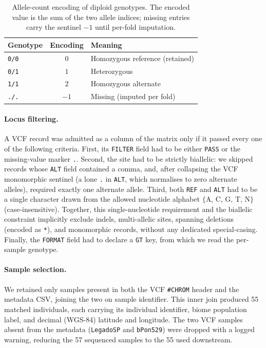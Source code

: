 \documentclass[twocolumn,10pt]{article}
\begin{document}
\begin{table}[t]
\centering
\begin{tabular}{lcl}
\toprule
Genotype & Encoding & Meaning \\
\midrule
\texttt{0/0} & $0$ & Homozygous reference (retained) \\
\texttt{0/1} & $1$ & Heterozygous \\
\texttt{1/1} & $2$ & Homozygous alternate \\
\texttt{./.} & $-1$ & Missing (imputed per fold) \\
\bottomrule
\end{tabular}
\caption{Allele-count encoding of diploid genotypes. The encoded value is the sum of the two allele
indices; missing entries carry the sentinel $-1$ until per-fold imputation.}
\label{tab:genotype-encoding}
\end{table}

\paragraph{Locus filtering.} A VCF record was admitted as a column of the matrix only if it passed
every one of the following criteria. First, its \texttt{FILTER} field had to be either \texttt{PASS}
or the missing-value marker \texttt{.}. Second, the site had to be strictly biallelic: we skipped
records whose \texttt{ALT} field contained a comma, and, after collapsing the VCF monomorphic
sentinel (a lone \texttt{.} in \texttt{ALT}, which normalises to zero alternate alleles), required
exactly one alternate allele. Third, both \texttt{REF} and \texttt{ALT} had to be a single character
drawn from the allowed nucleotide alphabet $\{$A, C, G, T, N$\}$ (case-insensitive). Together, this
single-nucleotide requirement and the biallelic constraint implicitly exclude indels, multi-allelic
sites, spanning deletions (encoded as \texttt{*}), and monomorphic records, without any dedicated
special-casing. Finally, the \texttt{FORMAT} field had to declare a \texttt{GT} key, from which we
read the per-sample genotype.

\paragraph{Sample selection.} We retained only samples present in both the VCF \texttt{\#CHROM}
header and the metadata CSV, joining the two on sample identifier. This inner join produced 55
matched individuals, each carrying its individual identifier, biome population label, and decimal
(WGS-84) latitude and longitude. The two VCF samples absent from the metadata (\texttt{LegadoSP} and
\texttt{bPon529}) were dropped with a logged warning, reducing the 57 sequenced samples to the 55
used downstream.
\end{document}
